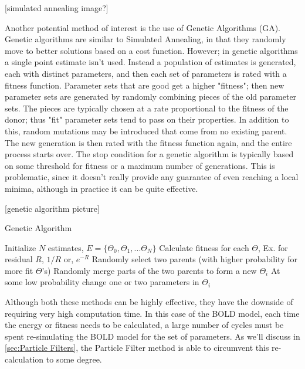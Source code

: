 [simulated annealing image?]

Another potential method of interest is the use of Genetic Algorithms
(GA). Genetic algorithms are similar to Simulated Annealing, in
that they randomly move to better solutions based on a cost function.
However; in genetic algorithms a single point estimate isn't used. Instead
a population of estimates is generated, each with distinct parameters,
and then each set of parameters is rated with a fitness function. Parameter
sets that are good get a higher "fitness"; then new parameter sets are generated by 
randomly combining pieces of the old parameter sets. The pieces are typically
chosen at a rate proportional to the fitness of the donor; thus "fit"
parameter sets tend to pass on their properties. In addition to this,
random mutations may be introduced that come from no existing parent. 
The new generation is then rated with the fitness function again, and
the entire process starts over. The stop condition for a genetic algorithm
is typically based on some threshold for fitness or a maximum number 
of generations. This is problematic, since it doesn't really provide 
any guarantee of even reaching a local minima, although in practice
it can be quite effective.

[genetic algorithm picture]

\begin{algorithm}
\caption{Genetic Algorithm}
\label{alg:Genetic Algorithm}
\begin{algorithmic}
\STATE Initialize $N$ estimates, $E = \{\Theta_0, \Theta_1, ... \Theta_N\}$
    \STATE Calculate fitness for each $\Theta$, Ex. for residual $R$, $1/R$ or, $e^{-R}$
        \STATE Randomly select two parents (with higher probability for more fit $\Theta$'s)
        \STATE Randomly merge parts of the two parents to form a new $\Theta_i$
        \STATE At some low probability change one or two parameters in $\Theta_i$
    \ENDFOR
\ENDFOR
\end{algorithmic}
\end{algorithm}

Although both these methods can be highly effective, they have the downside of
requiring very high computation time. In this case of the BOLD model,
each time the energy or fitness needs to be calculated, a large number of cycles
must be spent re-simulating the BOLD model for the set of parameters. As we'll
discuss in \autoref{sec:Particle Filters}, the Particle Filter method is able
to circumvent this re-calculation to some degree.

